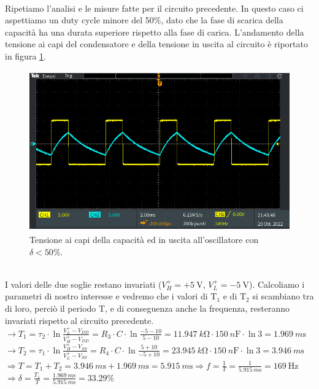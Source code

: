 \documentclass{report}
\begin{document}
\\Ripetiamo l'analisi e le misure fatte per il circuito precedente. In questo caso ci aspettiamo un duty cycle minore del 50\%, dato che la fase di scarica della capacità ha una durata superiore rispetto alla fase di carica. L'andamento della tensione ai capi del condensatore e della tensione in uscita al circuito è riportato in figura \ref{figura:oscillo4_2}.
\begin{figure}[h!]
	\centering
	\includegraphics[height=6.9cm]{immagini/TEK00034}
	\caption{Tensione ai capi della capacità ed in uscita all'oscillatore con $\delta<50\%$.}
	\label{figura:oscillo4_2}
\end{figure}
\\I valori delle due soglie restano invariati ($V_H^+=+\SI{5}{\volt}$, $V_L^+=\SI{-5}{\volt}$). Calcoliamo i parametri di nostro interesse e vedremo che i valori di $\mathrm{T_1}$ e di $\mathrm{T_2}$ si scambiano tra di loro, perciò il periodo T, e di conseguenza anche la frequenza, resteranno invariati rispetto al circuito precedente. 
\\[4pt]\indent$\rightarrow\displaystyle{T_1=\tau_2\cdot\ln\frac{V_L^+-V_{DD}}{V_H^+-V_{DD}}=R_3\cdot C\cdot\ln\frac{-5-10}{5-10}=\SI{11.947}{k\ohm}\cdot\SI{150}{n\farad}\cdot\ln3}=\SI{1.969}{m\second}$
\\[6pt]\indent$\rightarrow\displaystyle{T_2=\tau_1\cdot\ln\frac{V_H^+-V_{SS}}{V_L^+-V_{SS}}=R_4\cdot C\cdot\ln\frac{5+10}{-5+10}=\SI{23.945}{k\ohm}\cdot\SI{150}{n\farad}\cdot\ln3}=\SI{3.946}{m\second}$
\\[6pt]\indent$\Rightarrow\displaystyle{T=T_1+T_2=\SI{3.946}{m\second}+\SI{1.969}{m\second}=\SI{5.915}{m\second}}$\indent$\Rightarrow\displaystyle{f=\frac{1}{T}=\frac{1}{\SI{5.915}{m\second}}= \SI{169}{\hertz}}$
\\[6pt]\indent$\Rightarrow\displaystyle{\delta=\frac{T_1}{T}=\frac{\SI{1.969}{m\second}}{\SI{5.915}{m\second}}= 33.29\%}$
\end{document}
